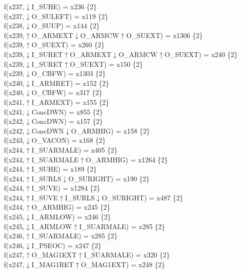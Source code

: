 f(x237,$\downarrow$I\_SUHE) = x236 \{2\} \\  
f(x237,$\downarrow$O\_SULEFT) = x119 \{2\} \\  
f(x238,$\downarrow$O\_SUUP) = x144 \{2\} \\  
f(x239,$\uparrow$O\_ARMEXT$\downarrow$O\_ARMCW$\uparrow$O\_SUEXT) = x1306 \{2\} \\  
f(x239,$\uparrow$O\_SUEXT) = x260 \{2\} \\  
f(x239,$\downarrow$I\_SURET$\uparrow$O\_ARMEXT$\downarrow$O\_ARMCW$\uparrow$O\_SUEXT) = x240 \{2\} \\  
f(x239,$\downarrow$I\_SURET$\uparrow$O\_SUEXT) = x150 \{2\} \\  
f(x239,$\downarrow$O\_CBFW) = x1303 \{2\} \\  
f(x240,$\downarrow$I\_ARMRET) = x152 \{2\} \\  
f(x240,$\downarrow$O\_CBFW) = x317 \{2\} \\  
f(x241,$\uparrow$I\_ARMEXT) = x155 \{2\} \\  
f(x241,$\downarrow$ConcDWN) = x855 \{2\} \\  
f(x242,$\downarrow$ConcDWN) = x157 \{2\} \\  
f(x242,$\downarrow$ConcDWN$\downarrow$O\_ARMHIG) = x158 \{2\} \\  
f(x243,$\downarrow$O\_VACON) = x168 \{2\} \\  
f(x244,$\uparrow$I\_SUARMALE) = x405 \{2\} \\  
f(x244,$\uparrow$I\_SUARMALE$\uparrow$O\_ARMHIG) = x1264 \{2\} \\  
f(x244,$\uparrow$I\_SUHE) = x189 \{2\} \\  
f(x244,$\uparrow$I\_SURLS$\downarrow$O\_SURIGHT) = x190 \{2\} \\  
f(x244,$\uparrow$I\_SUVE) = x1284 \{2\} \\  
f(x244,$\uparrow$I\_SUVE$\uparrow$I\_SURLS$\downarrow$O\_SURIGHT) = x487 \{2\} \\  
f(x244,$\uparrow$O\_ARMHIG) = x245 \{2\} \\  
f(x245,$\downarrow$I\_ARMLOW) = x246 \{2\} \\  
f(x245,$\downarrow$I\_ARMLOW$\uparrow$I\_SUARMALE) = x285 \{2\} \\  
f(x246,$\uparrow$I\_SUARMALE) = x285 \{2\} \\  
f(x246,$\downarrow$I\_PSEOC) = x247 \{2\} \\  
f(x247,$\uparrow$O\_MAG1EXT$\uparrow$I\_SUARMALE) = x320 \{2\} \\  
f(x247,$\downarrow$I\_MAG1RET$\uparrow$O\_MAG1EXT) = x248 \{2\} \\  
